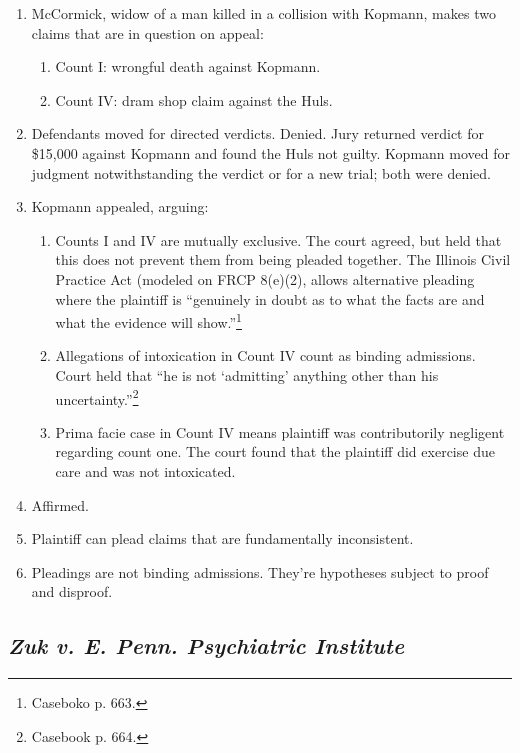 \begin{enumerate}
    \item McCormick, widow of a man killed in a collision with Kopmann, makes 
    two claims that are in question on appeal:
    \begin{enumerate}
        \item Count I: wrongful death against Kopmann.
        \item Count IV: dram shop claim against the Huls.
    \end{enumerate}
    \item Defendants moved for directed verdicts. Denied. Jury returned 
    verdict for \$15,000 against Kopmann and found the Huls not guilty. 
    Kopmann moved for judgment notwithstanding the verdict or for a new trial; 
    both were denied.  \item Kopmann appealed, arguing:
    \begin{enumerate}
        \item Counts I and IV are mutually exclusive. The court agreed, but 
        held that this does not prevent them from being pleaded together. The 
        Illinois Civil Practice Act (modeled on FRCP 8(e)(2), allows 
        alternative pleading where the plaintiff is ``genuinely in doubt as to 
        what the facts are and what the evidence will 
        show.''\footnote{Caseboko p. 663.}
        \item Allegations of intoxication in Count IV count as binding 
        admissions. Court held that ``he is not `admitting' anything other 
        than his uncertainty.''\footnote{Casebook p. 664.}
        \item Prima facie case in Count IV means plaintiff was contributorily 
        negligent regarding count one. The court found that the plaintiff did 
        exercise due care and was not intoxicated.
    \end{enumerate}
    \item Affirmed.
    \item Plaintiff can plead claims that are fundamentally inconsistent.
    \item Pleadings are not binding admissions. They're hypotheses subject to 
    proof and disproof.
\end{enumerate}

\subsection{\emph{Zuk v. E. Penn. Psychiatric Institute}}

